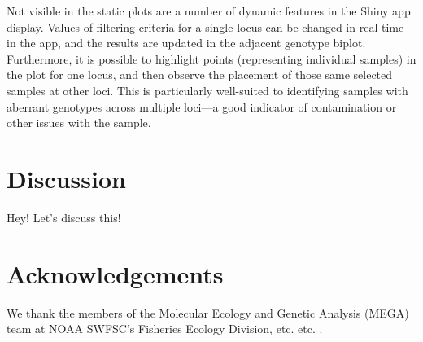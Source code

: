Not visible in the static plots are a number of dynamic features in the Shiny app display.
Values of filtering criteria for a single locus can be changed in real time in the app, and the results are updated in the adjacent genotype biplot.
Furthermore, it is possible to highlight points (representing individual samples) in the plot for one locus, and then observe the placement of those same selected samples at other loci.
This is particularly well-suited to identifying samples with aberrant genotypes across multiple loci---a good indicator of contamination or other issues with the sample.  

\section*{Discussion}
Hey! Let's discuss this!



\section*{Acknowledgements}
We thank the members of the Molecular Ecology and Genetic Analysis (MEGA) team at NOAA SWFSC's Fisheries Ecology Division, etc. etc. .
